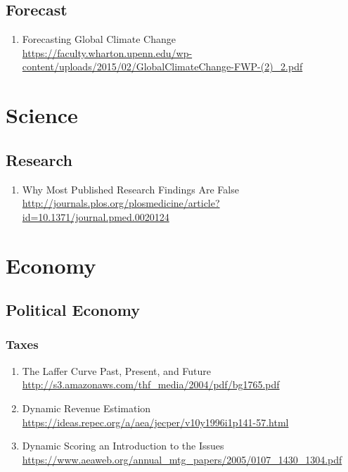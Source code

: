 \documentclass{article}
\begin{document}
\subsection{Forecast}
\begin{enumerate}
	\item {Forecasting Global Climate Change\\
\url{https://faculty.wharton.upenn.edu/wp-content/uploads/2015/02/GlobalClimateChange-FWP-(2)_2.pdf}}
\end{enumerate}

\section{Science}
\subsection{Research}
\begin{enumerate}
	\item {Why Most Published Research Findings Are False\\
	\url{http://journals.plos.org/plosmedicine/article?id=10.1371/journal.pmed.0020124}}
\end{enumerate}

\section{Economy}
\subsection {Political Economy}
\subsubsection{Taxes}
\begin{enumerate}
	\item {The Laffer Curve Past, Present, and Future\\
\url{http://s3.amazonaws.com/thf_media/2004/pdf/bg1765.pdf}}
	\item {Dynamic Revenue Estimation\\
\url{https://ideas.repec.org/a/aea/jecper/v10y1996i1p141-57.html}}
	\item {Dynamic Scoring an Introduction to the Issues\\
\url{https://www.aeaweb.org/annual_mtg_papers/2005/0107_1430_1304.pdf}}
\end{enumerate}
\end{document}
